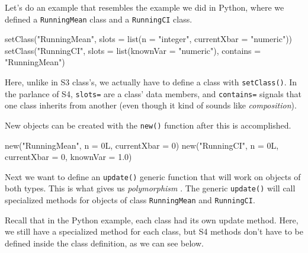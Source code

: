 \documentclass[
  12pt,
  krantz2]{krantz}
\makeatletter
\newenvironment{Shaded}{\begin{snugshade}}{\end{snugshade}}
\newcommand{\AttributeTok}[1]{\textcolor[rgb]{0.61,0.61,0.61}{#1}}
\newcommand{\DecValTok}[1]{\textcolor[rgb]{0.06,0.06,0.06}{#1}}
\newcommand{\FloatTok}[1]{\textcolor[rgb]{0.06,0.06,0.06}{#1}}
\newcommand{\FunctionTok}[1]{\textcolor[rgb]{0,0,0}{#1}}
\newcommand{\NormalTok}[1]{#1}
\newcommand{\StringTok}[1]{\textcolor[rgb]{0.5,0.5,0.5}{#1}}
\newenvironment{kframe}{%
\medskip{}
\setlength{\fboxsep}{.8em}
 \def\at@end@of@kframe{}%
 \ifinner\ifhmode%
  \def\at@end@of@kframe{\end{minipage}}%
  \begin{minipage}{\columnwidth}%
 \fi\fi%
 \def\FrameCommand##1{\hskip\@totalleftmargin \hskip-\fboxsep
 \colorbox{shadecolor}{##1}\hskip-\fboxsep
     \hskip-\linewidth \hskip-\@totalleftmargin \hskip\columnwidth}%
 \MakeFramed {\advance\hsize-\width
   \@totalleftmargin\z@ \linewidth\hsize
   \@setminipage}}%
 {\par\unskip\endMakeFramed%
 \at@end@of@kframe}
\renewenvironment{Shaded}{\begin{kframe}}{\end{kframe}}
\makeatother
\begin{document}
Let's do an example that resembles the example we did in Python, where we defined a \texttt{RunningMean} class and a \texttt{RunningCI} class.

\begin{Shaded}
\begin{Highlighting}[]
\FunctionTok{setClass}\NormalTok{(}\StringTok{"RunningMean"}\NormalTok{,}
         \AttributeTok{slots =} \FunctionTok{list}\NormalTok{(}\AttributeTok{n =} \StringTok{"integer"}\NormalTok{, }
                      \AttributeTok{currentXbar =} \StringTok{"numeric"}\NormalTok{))}
\FunctionTok{setClass}\NormalTok{(}\StringTok{"RunningCI"}\NormalTok{,}
         \AttributeTok{slots =} \FunctionTok{list}\NormalTok{(}\AttributeTok{knownVar =} \StringTok{"numeric"}\NormalTok{),}
         \AttributeTok{contains =} \StringTok{"RunningMean"}\NormalTok{)}
\end{Highlighting}
\end{Shaded}

Here, unlike in S3 class's, we actually have to define a class with \texttt{setClass()}. In the parlance of S4, \texttt{slots=} are a class' data members, and \texttt{contains=} signals that one class inherits from another (even though it kind of sounds like \emph{composition}).

New objects can be created with the \texttt{new()} function after this is accomplished.

\begin{Shaded}
\begin{Highlighting}[]
\FunctionTok{new}\NormalTok{(}\StringTok{"RunningMean"}\NormalTok{, }\AttributeTok{n =}\NormalTok{ 0L, }\AttributeTok{currentXbar =} \DecValTok{0}\NormalTok{)}
\FunctionTok{new}\NormalTok{(}\StringTok{"RunningCI"}\NormalTok{, }\AttributeTok{n =}\NormalTok{ 0L, }\AttributeTok{currentXbar =} \DecValTok{0}\NormalTok{, }\AttributeTok{knownVar =} \FloatTok{1.0}\NormalTok{)}
\end{Highlighting}
\end{Shaded}

Next we want to define an \texttt{update()} generic function that will work on objects of both types. This is what gives us \emph{polymorphism} . The generic \texttt{update()} will call specialized methods for objects of class \texttt{RunningMean} and \texttt{RunningCI}.

Recall that in the Python example, each class had its own update method. Here, we still have a specialized method for each class, but S4 methods don't have to be defined inside the class definition, as we can see below.
\end{document}
